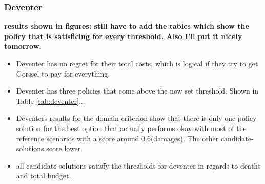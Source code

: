 \subsubsection{Deventer}
\textbf{results shown in figures: still have to add the tables which show the policy that is satisficing for every threshold. Also I'll put it nicely tomorrow. }
\begin{itemize}
    \item Deventer has no regret for their total costs, which is logical if they try to get Gorssel to pay for everything.
    \item Deventer has three policies that come above the now set threshold. Shown in Table \ref{tab:deventer}...
    \item Deventers results for the domain criterion show that there is only one policy solution for the best option that actually performs okay with most of the reference scenarios with a score around 0.6(damages). The other candidate-solutions score lower. 
    \item all candidate-solutions satisfy the thresholds for deventer in regards to deaths and total budget.
\end{itemize}

